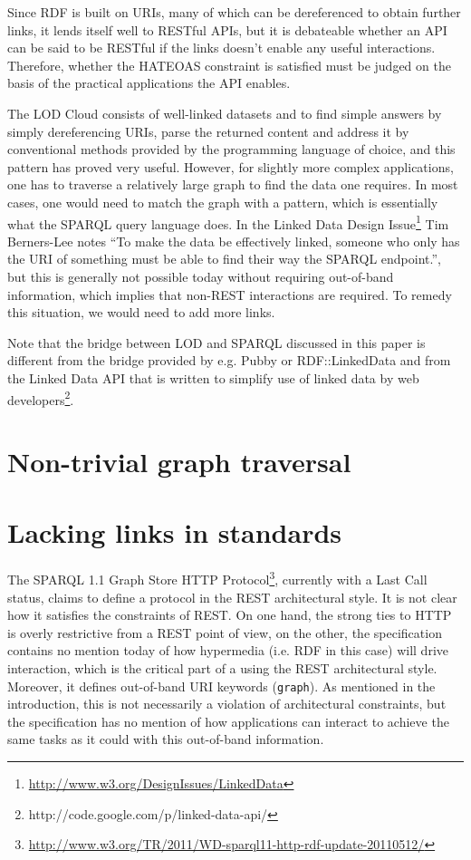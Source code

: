 \documentclass{llncs}
\begin{document}
Since RDF is built on URIs, many of which can be dereferenced to
obtain further links, it lends itself well to RESTful APIs, but it is
debateable whether an API can be said to be RESTful if the links
doesn't enable any useful interactions. Therefore, whether the HATEOAS
constraint is satisfied must be judged on the basis of the practical
applications the API enables.

The LOD Cloud consists of well-linked datasets and to find simple
answers by simply dereferencing URIs, parse the returned content and
address it by conventional methods provided by the programming
language of choice, and this pattern has proved very useful. However,
for slightly more complex applications, one has to traverse a
relatively large graph to find the data one requires. In most cases,
one would need to match the graph with a pattern, which is essentially
what the SPARQL query language does. In the Linked Data Design
Issue\footnote{\url{http://www.w3.org/DesignIssues/LinkedData}} Tim
Berners-Lee notes ``To make the data be effectively linked, someone
who only has the URI of something must be able to find their way the
SPARQL endpoint.'', but this is generally not possible today without
requiring out-of-band information, which implies that non-REST
interactions are required. To remedy this situation, we would need to
add more links.

Note that the bridge between LOD and SPARQL discussed in this paper is
different from the bridge provided by e.g. Pubby or RDF::LinkedData
and from the Linked Data API that is written to simplify use of linked
data by web developers\footnote{http://code.google.com/p/linked-data-api/}.

\section{Non-trivial graph traversal}

\section{Lacking links in standards}

The SPARQL 1.1 Graph Store HTTP
Protocol\footnote{\url{http://www.w3.org/TR/2011/WD-sparql11-http-rdf-update-20110512/}},
currently with a Last Call status, claims to define a protocol in the
REST architectural style. It is not clear how it satisfies the
constraints of REST. On one hand, the strong ties to HTTP is overly
restrictive from a REST point of view, on the other, the specification
contains no mention today of how hypermedia (i.e. RDF in this case)
will drive interaction, which is the critical part of a using the REST
architectural style. Moreover, it defines out-of-band URI keywords
(\texttt{graph}). As mentioned in the introduction, this is not
necessarily a violation of architectural constraints, but the
specification has no mention of how applications can interact to
achieve the same tasks as it could with this out-of-band information.
\end{document}
